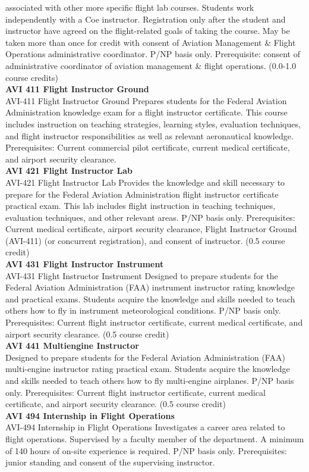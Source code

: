 \documentclass[
  letterpaper,
]{scrbook}
\begin{document}
associated with other more specific flight lab courses. Students work
independently with a Coe instructor. Registration only after the student
and instructor have agreed on the flight-related goals of taking the
course. May be taken more than once for credit with consent of Aviation
Management \& Flight Operations administrative coordinator. P/NP basis
only. Prerequisite: consent of administrative coordinator of aviation
management \& flight operations. (0.0-1.0 course credits)\\
\textbf{AVI 411 Flight Instructor Ground}\\
AVI-411 Flight Instructor Ground Prepares students for the Federal
Aviation Administration knowledge exam for a flight instructor
certificate. This course includes instruction on teaching strategies,
learning styles, evaluation techniques, and flight instructor
responsibilities as well as relevant aeronautical knowledge.
Prerequisites: Current commercial pilot certificate, current medical
certificate, and airport security clearance.\\
\textbf{AVI 421 Flight Instructor Lab}\\
AVI-421 Flight Instructor Lab Provides the knowledge and skill necessary
to prepare for the Federal Aviation Administration flight instructor
certificate practical exam. This lab includes flight instruction in
teaching techniques, evaluation techniques, and other relevant areas.
P/NP basis only. Prerequisites: Current medical certificate, airport
security clearance, Flight Instructor Ground (AVI-411) (or concurrent
registration), and consent of instructor. (0.5 course credit)\\
\textbf{AVI 431 Flight Instructor Instrument}\\
AVI-431 Flight Instructor Instrument Designed to prepare students for
the Federal Aviation Administration (FAA) instrument instructor rating
knowledge and practical exams. Students acquire the knowledge and skills
needed to teach others how to fly in instrument meteorological
conditions. P/NP basis only. Prerequisites: Current flight instructor
certificate, current medical certificate, and airport security
clearance. (0.5 course credit)\\
\textbf{AVI 441 Multiengine Instructor}\\
Designed to prepare students for the Federal Aviation Administration
(FAA) multi-engine instructor rating practical exam. Students acquire
the knowledge and skills needed to teach others how to fly multi-engine
airplanes. P/NP basis only. Prerequisites: Current flight instructor
certificate, current medical certificate, and airport security
clearance. (0.5 course credit)\\
\textbf{AVI 494 Internship in Flight Operations}\\
AVI-494 Internship in Flight Operations Investigates a career area
related to flight operations. Supervised by a faculty member of the
department. A minimum of 140 hours of on-site experience is required.
P/NP basis only. Prerequisites: junior standing and consent of the
supervising instructor.
\end{document}
